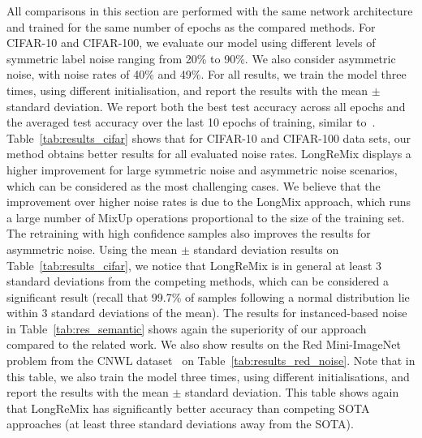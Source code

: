 \documentclass[review]{elsarticle}
\begin{document}
\begin{table}[t]
\footnotesize
\centering
{}
\caption{Results for Food-101N~\cite{lee2018cleannet}. Methods marked by * denote re-implementations based on public code.}
\label{tab:res_food}
\end{table}


All comparisons in this section are performed with the same network architecture and trained for the same number of epochs as the compared methods.
For CIFAR-10 and CIFAR-100, we evaluate our model using different levels of symmetric label noise ranging from 20\% to 90\%. We also consider asymmetric noise, with noise rates of 40\% and 49\%. 
For all results, we train the model three times, using different initialisation, and report the results with the mean $\pm$ standard deviation.
We report both the best test accuracy across all epochs and the averaged test accuracy over the last 10 epochs of training, similar to~\cite{li2020dividemix}. Table~\ref{tab:results_cifar} shows that for CIFAR-10 and CIFAR-100 data sets, our method obtains better results for all evaluated noise rates. LongReMix displays a higher improvement for large symmetric noise and asymmetric noise scenarios, which can be considered as the most challenging cases. We believe that the improvement over higher noise rates is due to the LongMix approach, which runs a large number of MixUp operations proportional to the size of the training set. The retraining with high confidence samples also improves the results for asymmetric noise. 
Using the mean $\pm$ standard deviation results on Table~\ref{tab:results_cifar}, 
we notice that LongReMix is in general at least 3 standard deviations from the competing methods, which can be considered a significant result (recall that 99.7\% of samples following a normal distribution lie within 3 standard deviations of the mean).
The results for instanced-based noise~\cite{rog} in
Table~\ref{tab:res_semantic} shows again the superiority of our approach compared to the related work.
We also show results on the Red Mini-ImageNet problem from the CNWL dataset~\cite{jiang2020beyond,FaMUS} on Table~\ref{tab:results_red_noise}. Note that in this table, we also train the model three times, using different initialisations, and report the results with the mean $\pm$ standard deviation.
This table shows again that LongReMix has significantly better accuracy than competing SOTA approaches (at least three standard deviations away from the SOTA).
\end{document}

